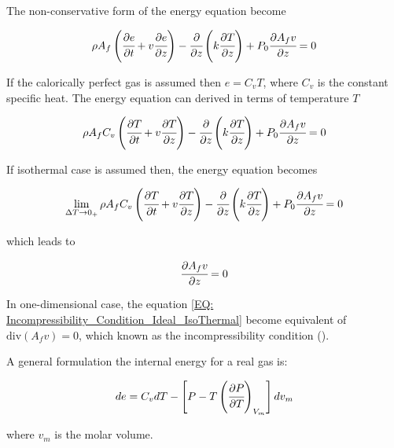 \documentclass[../Article_Model_Parameters.tex]{subfiles}
\begin{document}
	The non-conservative form of the energy equation become
	
	{\footnotesize
		\begin{equation*}
		\rho A_f \left( \cfrac{\partial e }{\partial t} + v \cfrac{\partial e}{\partial z} \right) - \cfrac{\partial}{\partial z} \left( k \cfrac{\partial T}{\partial z} \right) + P_0 \cfrac{\partial A_f v}{\partial z} = 0
		\end{equation*}
	}
	
	If the calorically perfect gas is assumed then $e=C_vT$, where $C_v$ is the constant specific heat. The energy equation can derived in terms of temperature $T$
	
	{\footnotesize
		\begin{equation*}
			\rho A_f C_v \left( \cfrac{\partial T }{\partial t} + v \cfrac{\partial T}{\partial z} \right) - \cfrac{\partial}{\partial z} \left( k \cfrac{\partial T}{\partial z} \right) + P_0 \cfrac{\partial A_f v}{\partial z} = 0
		\end{equation*}
	}
	
	If isothermal case is assumed then, the energy equation becomes
	
	{\footnotesize
		\begin{equation*}
			\lim_{\Delta T \rightarrow 0_+} \rho A_f C_v \left( \cfrac{\partial T }{\partial t} + v \cfrac{\partial T}{\partial z} \right) - \cfrac{\partial}{\partial z} \left( k \cfrac{\partial T}{\partial z} \right) + P_0 \cfrac{\partial A_f v}{\partial z} = 0
		\end{equation*}
	}
	
	which leads to
	
	{\footnotesize
		\begin{equation}
			\cfrac{\partial A_f v}{\partial z} = 0
			\label{EQ: Incompressibility_Condition_Ideal_IsoThermal}
		\end{equation}
	}
	
	In one-dimensional case, the equation \ref{EQ: Incompressibility_Condition_Ideal_IsoThermal} become equivalent of $\text{div} ( A_f v) = 0$, which known as the incompressibility condition (\citet{Lions2013}). 
	
		A general formulation the internal energy for a real gas is:
	
	{\footnotesize
		\begin{equation*}
			de=C_vdT-\left[P-T\left(\cfrac{\partial P}{\partial T}\right)_{V_m}\right]dv_m
	\end{equation*} }
	
	where $v_m$ is the molar volume.
	
\end{document}
